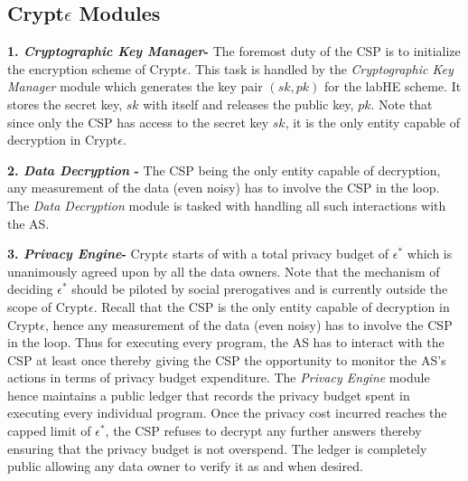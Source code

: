 \subsection{Crypt$\epsilon$ Modules}


\textbf{1. \textit{ Cryptographic Key Manager}-} The foremost duty of the \textsf{CSP} is to initialize the encryption scheme of Crypt$\epsilon$. This task is handled by the \textit{Cryptographic Key Manager} module which generates the key pair $(sk,pk)$ for the \textsf{labHE} scheme. It stores the secret key, $sk$ with itself and releases the public key, $pk$. Note that since only the \textsf{CSP} has access to the secret key $sk$, it is the only entity capable of decryption in Crypt$\epsilon$.

\textbf{2. \textit{ Data Decryption} - } The \textsf{CSP} being the only entity capable of decryption,  any measurement of the data (even noisy) has to involve the \textsf{CSP} in the loop. The \textit{Data Decryption} module is tasked with handling all such interactions with the \textsf{AS}. 

\textbf{3. \textit{ Privacy Engine}-} Crypt$\epsilon$ starts of with a total privacy budget of $\epsilon^*$ which is unanimously agreed upon by all the data owners. Note that the mechanism of deciding $\epsilon^*$ should be piloted by social prerogatives and is currently outside the scope of Crypt$\epsilon$. Recall that the CSP is the only entity capable of decryption in Crypt$\epsilon$, hence any measurement of the data (even noisy) has to involve the \textsf{CSP} in the loop.  Thus for executing every program, the \textsf{AS} has to interact with the \textsf{CSP} at least once thereby giving the \textsf{CSP} the opportunity to monitor the \textsf{AS}'s actions in terms of privacy budget expenditure. The \textit{Privacy Engine} module hence maintains a public ledger that records the privacy budget spent in executing every individual program. Once the privacy cost incurred reaches the capped limit of $\epsilon^*$, the \textsf{CSP} refuses to decrypt any further answers thereby ensuring that the privacy budget is not overspend.  The ledger is completely public allowing any data owner to verify it as and when desired.
